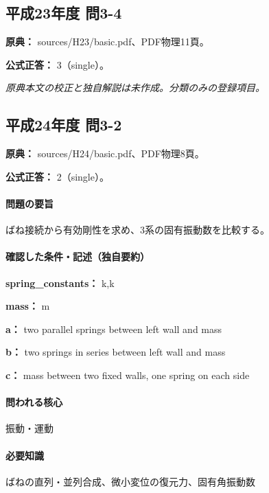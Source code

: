 \subsection{平成23年度 問3-4}
\label{q:h23-reg-basic-3-4}

\noindent\textbf{原典：} sources/H23/basic.pdf、PDF物理11頁。

\textbf{公式正答：} 3（single）。

\par\textit{原典本文の校正と独自解説は未作成。分類のみの登録項目。}

\subsection{平成24年度 問3-2}
\label{q:h24-reg-basic-3-2}

\noindent\textbf{原典：} sources/H24/basic.pdf、PDF物理8頁。

\textbf{公式正答：} 2（single）。

\paragraph{問題の要旨} ばね接続から有効剛性を求め、3系の固有振動数を比較する。

\paragraph{確認した条件・記述（独自要約）}\mbox{}\par

\noindent\textbf{spring\_constants：} k,k\par

\noindent\textbf{mass：} m\par

\noindent\textbf{a：} two parallel springs between left wall and mass\par

\noindent\textbf{b：} two springs in series between left wall and mass\par

\noindent\textbf{c：} mass between two fixed walls, one spring on each side\par

\paragraph{問われる核心} 振動・運動

\paragraph{必要知識} ばねの直列・並列合成、微小変位の復元力、固有角振動数

